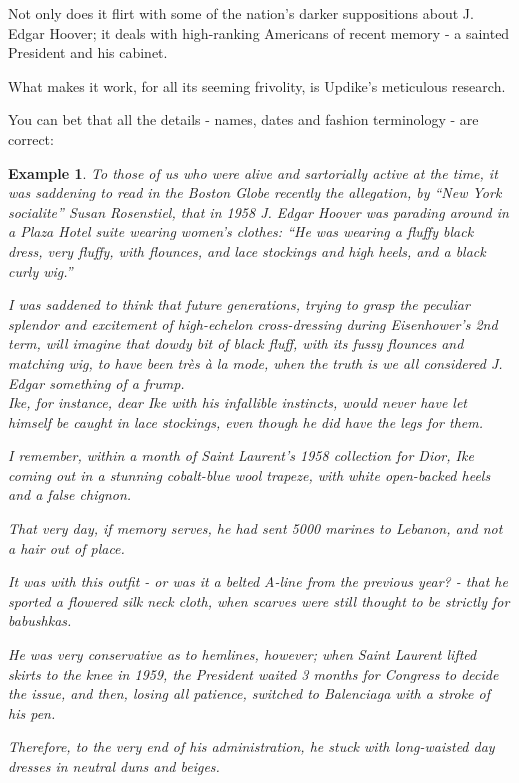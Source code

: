\documentclass{book}
\numberwithin{equation}{section}
\newtheorem{example}{Example}[chapter]
\begin{document}
Not only does it flirt with some of the nation's darker suppositions about J. Edgar Hoover; it deals with high-ranking Americans of recent memory - a sainted President and his cabinet.

What makes it work, for all its seeming frivolity, is Updike's meticulous research.

You can bet that all the details - names, dates and fashion terminology - are correct:
\begin{example}
    To those of us who were alive and sartorially active at the time, it was saddening to read in the Boston \emph{Globe} recently the allegation, by ``New York socialite'' Susan Rosenstiel, that in 1958 J. Edgar Hoover was parading around in a Plaza Hotel suite wearing women's clothes: ``He was wearing a fluffy black dress, very fluffy, with flounces, and lace stockings and high heels, and a black curly wig.''
    
    I was saddened to think that future generations, trying to grasp the peculiar splendor and excitement of high-echelon cross-dressing during Eisenhower's 2nd term, will imagine that dowdy bit of black fluff, with its fussy flounces and matching wig, to have been \emph{tr\`es \`a la mode}, when the truth is we all considered J. Edgar something of a frump.\\
    
    Ike, for instance, dear Ike with his infallible instincts, would never have let himself be caught in lace stockings, even though he did have the legs for them.
    
    I remember, within a month of Saint Laurent's 1958 collection for Dior, Ike coming out in a stunning cobalt-blue wool trapeze, with white open-backed heels and a false chignon.
    
    That very day, if memory serves, he had sent 5000 marines to Lebanon, and not a hair out of place.
    
    It was with this outfit - or was it a belted A-line from the previous year? - that he sported a flowered silk neck cloth, when scarves were still thought to be strictly for babushkas.
    
    He was very conservative as to hemlines, however; when Saint Laurent lifted skirts to the knee in 1959, the President waited 3 months for Congress to decide the issue, and then, losing all patience, switched to Balenciaga with a stroke of his pen.
    
    Therefore, to the very end of his administration, he stuck with long-waisted day dresses in neutral duns and beiges.
    \\
    

\end{example}
\end{document}
